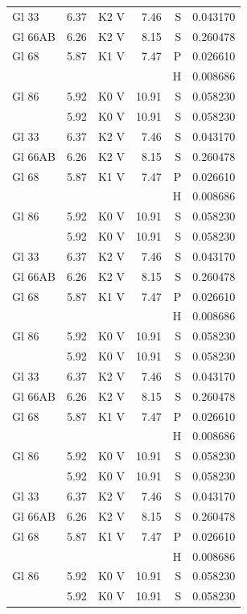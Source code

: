 \documentclass{aa}
\begin{document}
\begin{appendix}
\begin{longtable}{lllrrr}
Gl 33    & 6.37 & K2 V & 7.46 & S & 0.043170\\
Gl 66AB  & 6.26 & K2 V & 8.15 & S & 0.260478\\
Gl 68    & 5.87 & K1 V & 7.47 & P & 0.026610\\
         &      &      &      & H & 0.008686\\
Gl 86    & 5.92 & K0 V & 10.91& S & 0.058230\\            & 5.92 & K0 V & 10.91& S & 0.058230\\
Gl 33    & 6.37 & K2 V & 7.46 & S & 0.043170\\
Gl 66AB  & 6.26 & K2 V & 8.15 & S & 0.260478\\
Gl 68    & 5.87 & K1 V & 7.47 & P & 0.026610\\
         &      &      &      & H & 0.008686\\
Gl 86    & 5.92 & K0 V & 10.91& S & 0.058230\\            & 5.92 & K0 V & 10.91& S & 0.058230\\
Gl 33    & 6.37 & K2 V & 7.46 & S & 0.043170\\
Gl 66AB  & 6.26 & K2 V & 8.15 & S & 0.260478\\
Gl 68    & 5.87 & K1 V & 7.47 & P & 0.026610\\
         &      &      &      & H & 0.008686\\
Gl 86    & 5.92 & K0 V & 10.91& S & 0.058230\\            & 5.92 & K0 V & 10.91& S & 0.058230\\
Gl 33    & 6.37 & K2 V & 7.46 & S & 0.043170\\
Gl 66AB  & 6.26 & K2 V & 8.15 & S & 0.260478\\
Gl 68    & 5.87 & K1 V & 7.47 & P & 0.026610\\
         &      &      &      & H & 0.008686\\
Gl 86    & 5.92 & K0 V & 10.91& S & 0.058230\\            & 5.92 & K0 V & 10.91& S & 0.058230\\
Gl 33    & 6.37 & K2 V & 7.46 & S & 0.043170\\
Gl 66AB  & 6.26 & K2 V & 8.15 & S & 0.260478\\
Gl 68    & 5.87 & K1 V & 7.47 & P & 0.026610\\
         &      &      &      & H & 0.008686\\
Gl 86    & 5.92 & K0 V & 10.91& S & 0.058230\\            & 5.92 & K0 V & 10.91& S & 0.058230\\

\end{longtable}
\end{appendix}
\end{document}
